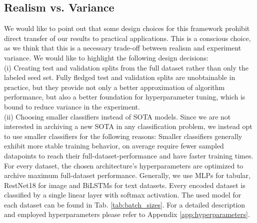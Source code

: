\documentclass[]{article}
\begin{document}
\subsection{Realism vs. Variance}\label{sec:realism}
We would like to point out that some design choices for this framework prohibit direct transfer of our results to practical applications. 
This is a conscious choice, as we think that this is a necessary trade-off between realism and experiment variance.
We would like to highlight the following design decisions: \\
(i) Creating test and validation splits from the full dataset rather than only the labeled seed set. Fully fledged test and validation splits are unobtainable in practice, but they provide not only a better approximation of algorithm performance, but also a better foundation for hyperparameter tuning, which is bound to reduce variance in the experiment. \\
(ii) Choosing smaller classifiers instead of SOTA models. Since we are not interested in archiving a new SOTA in any classification problem, we instead opt to use smaller classifiers for the following reasons:
Smaller classifiers generally exhibit more stable training behavior, on average require fewer sampled datapoints to reach their full-dataset-performance and have faster training times.
For every dataset, the chosen architecture's hyperparameters are optimized to archive maximum full-dataset performance.
Generally, we use MLPs for tabular, RestNet18 for image and BiLSTMs for text datasets.
Every encoded dataset is classified by a single linear layer with softmax activation.
The used model for each dataset can be found in Tab. \ref{tab:batch_sizes}.
For a detailed description and employed hyperparameters please refer to Appendix \ref{app:hyperparameters}. 


\end{document}
